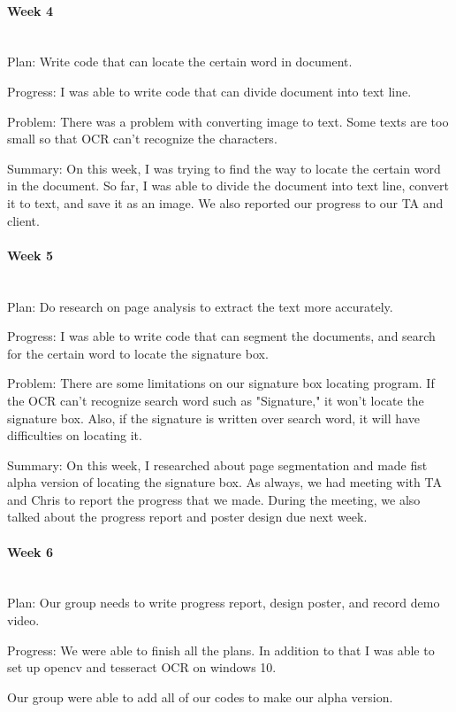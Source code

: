 \documentclass[article, onecolumn, draftclsnofoot,10pt, compsoc]{IEEEtran}
\begin{document}
\paragraph{Week 4}
\mbox{}\\
Plan: Write code that can locate the certain word in document.

Progress: I was able to write code that can divide document into text line.
 
Problem: There was a problem with converting image to text. Some texts are too small so that OCR can't recognize the characters.

Summary: On this week, I was trying to find the way to locate the certain word in the document. So far, I was able to divide the document into text line, convert it to text, and save it as an image. We also reported our progress to our TA and client.

\paragraph{Week 5}
\mbox{}\\
Plan: Do research on page analysis to extract the text more accurately.
 
Progress: I was able to write code that can segment the documents, and search for the certain word to locate the signature box.
 
Problem: There are some limitations on our signature box locating program. If the OCR can't recognize search word such as "Signature," it won't locate the signature box. Also, if the signature is written over search word, it will have difficulties on locating it.

Summary: On this week, I researched about page segmentation and made fist alpha version of locating the signature box. As always, we had meeting with TA and Chris to report the progress that we made. During the meeting, we also talked about the progress report and poster design due next week.

\paragraph{Week 6}
\mbox{}\\
Plan: Our group needs to write progress report, design poster, and record demo video.
 
Progress: We were able to finish all the plans. In addition to that I was able to set up opencv and tesseract OCR on windows 10.

Our group were able to add all of our codes to make our alpha version.
\end{document}

